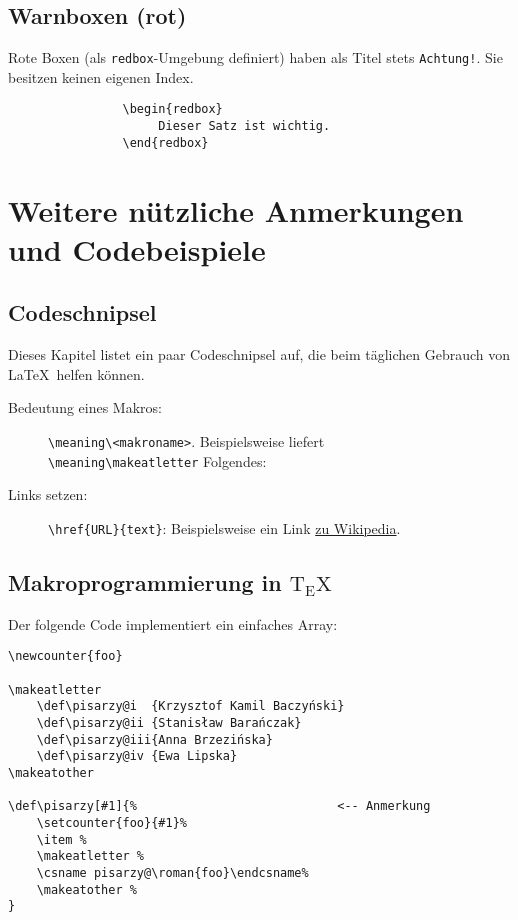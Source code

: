 		\section{Warnboxen (rot)}
			Rote Boxen (als \verb|redbox|-Umgebung definiert) haben als Titel stets \texttt{Achtung!}. Sie besitzen keinen eigenen Index.

			\begin{verbatim}
				\begin{redbox}
				     Dieser Satz ist wichtig.
				\end{redbox}
			\end{verbatim}


	\chapter{Weitere nützliche Anmerkungen und Codebeispiele}
		\section{Codeschnipsel}
			Dieses Kapitel listet ein paar Codeschnipsel auf, die beim täglichen Gebrauch von \LaTeX\ helfen können.
			\begin{description}
				\item[Bedeutung eines Makros:]
					\verb|\meaning\<makroname>|. Beispielsweise liefert\\\verb|\meaning\makeatletter| Folgendes: \texttt{\meaning\makeatletter}
				\item[Links setzen:]
					\verb|\href{URL}{text}|: Beispielsweise ein Link \href{https://de.wikipedia.org/wiki/LaTeX}{zu Wikipedia}.
			\end{description}

		\section{Makroprogrammierung in ${\mathrm{T\!_{\displaystyle E}\!X}}$}
			Der folgende Code implementiert ein einfaches Array:
			\begin{verbatim}
\newcounter{foo}

\makeatletter
    \def\pisarzy@i 	{Krzysztof Kamil Baczyński}
    \def\pisarzy@ii	{Stanisław Barańczak}
    \def\pisarzy@iii{Anna Brzezińska}
    \def\pisarzy@iv {Ewa Lipska}
\makeatother

\def\pisarzy[#1]{%                            <-- Anmerkung
    \setcounter{foo}{#1}%
    \item %
    \makeatletter %
    \csname pisarzy@\roman{foo}\endcsname%
    \makeatother %
}
			\end{verbatim}


